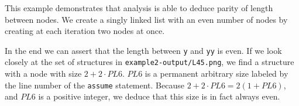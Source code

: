 This example demonstrates that analysis is able to deduce parity of length between nodes. We create a singly linked list with an even number of nodes by creating at each iteration two nodes at once.

In the end we can assert that the length between \texttt{y} and \texttt{yy} is even. If we look closely at the set of structures in \texttt{example2-output/L45.png}, we find a structure with a node with size $2 + 2\cdot PL6$. $PL6$ is a permanent arbitrary size labeled by the line number of the \texttt{assume} statement. Because $2+2\cdot PL6 = 2(1+PL6)$, and $PL6$ is a positive integer, we deduce that this size is in fact always even.
